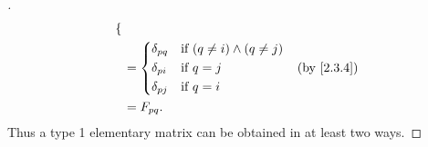 \begin{proof}[]
\begin{align*}
\begin{dcases}
                                                    \end{dcases} \\
                                                & = \begin{dcases}
                                                      \delta_{p q} & \text{if } (q \neq i) \land (q \neq j) \\
                                                      \delta_{p i} & \text{if } q = j                       \\
                                                      \delta_{p j} & \text{if } q = i
                                                    \end{dcases}    &  & \text{(by \cref{2.3.4})}    \\
                                                & = F_{p q}.
  \end{align*}
  Thus a type 1 elementary matrix can be obtained in at least two ways.


\end{proof}
